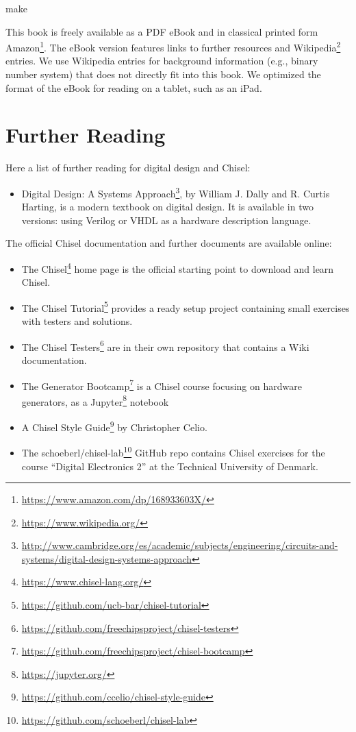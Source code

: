 \documentclass[%
    10pt,
    headinclude, footexclude,
    openright, %
    notitlepage,
    cleardoubleempty,
    headsepline,
    pointlessnumbers,
    bibtotoc, idxtotoc,
    ]{scrbook}
\newcommand{\myref}[2]{\href{#1}{#2}}
\renewcommand{\myref}[2]{{#2}{\footnote{\url{#1}}}}
\begin{document}
\begin{chisel}
make
\end{chisel}

This book is freely available as a PDF eBook and in classical printed form
\myref{https://www.amazon.com/dp/168933603X/}{Amazon}.
The eBook version features links to further resources
and \myref{https://www.wikipedia.org/}{Wikipedia} entries.
We use Wikipedia entries for background information (e.g., binary number system)
that does not directly fit into this book.
We optimized the format of the eBook for reading on a tablet, such as an iPad.



\section{Further Reading}

Here a list of further reading for digital design and Chisel:
\begin{itemize}
\item \myref{http://www.cambridge.org/es/academic/subjects/engineering/circuits-and-systems/digital-design-systems-approach}{Digital Design: A Systems Approach}, by William J. Dally and R. Curtis Harting,
is a modern textbook on digital design. It is available in two versions: using Verilog or VHDL as a hardware description language.
\end{itemize}

The official Chisel documentation and further documents are available online:

\begin{itemize}
\item The \myref{https://www.chisel-lang.org/}{Chisel} home page is the official starting point to
download and learn Chisel.
\item The \myref{https://github.com/ucb-bar/chisel-tutorial}{Chisel Tutorial} provides a ready setup
project containing small exercises with testers and solutions.

\item The \myref{https://github.com/freechipsproject/chisel-testers}{Chisel Testers} are in
their own repository that contains a Wiki documentation.
\item The \myref{https://github.com/freechipsproject/chisel-bootcamp}{Generator Bootcamp} is
a Chisel course focusing on hardware generators, as a \myref{https://jupyter.org/}{Jupyter} notebook
\item A \myref{https://github.com/ccelio/chisel-style-guide}{Chisel Style Guide} by Christopher Celio.
\item The \myref{https://github.com/schoeberl/chisel-lab}{schoeberl/chisel-lab} GitHub repo
contains Chisel exercises for the course ``Digital Electronics 2'' at the Technical University of Denmark.
\end{itemize}
\end{document}
